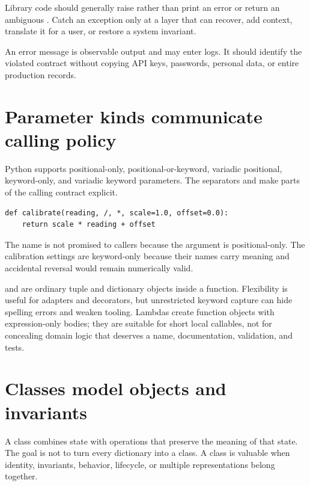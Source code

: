 Library code should generally raise rather than print an error or return an
ambiguous . Catch an exception only at a layer that can recover, add
context, translate it for a user, or restore a system invariant.

\begin{warningbox}
An error message is observable output and may enter logs. It should identify the
violated contract without copying API keys, passwords, personal data, or entire
production records.
\end{warningbox}

\section{Parameter kinds communicate calling policy}

Python supports positional-only, positional-or-keyword, variadic positional,
keyword-only, and variadic keyword parameters. The separators \code{/} and
\code{*} make parts of the calling contract explicit.

\begin{lstlisting}
def calibrate(reading, /, *, scale=1.0, offset=0.0):
    return scale * reading + offset
\end{lstlisting}

The name  is not promised to callers because the argument is
positional-only. The calibration settings are keyword-only because their names
carry meaning and accidental reversal would remain numerically valid.

 and  are ordinary tuple and dictionary objects
inside a function. Flexibility is useful for adapters and decorators, but
unrestricted keyword capture can hide spelling errors and weaken tooling.
Lambdas create function objects with expression-only bodies; they are suitable
for short local callables, not for concealing domain logic that deserves a name,
documentation, validation, and tests.

\section{Classes model objects and invariants}

A class combines state with operations that preserve the meaning of that state.
The goal is not to turn every dictionary into a class. A class is valuable when
identity, invariants, behavior, lifecycle, or multiple representations belong
together.

